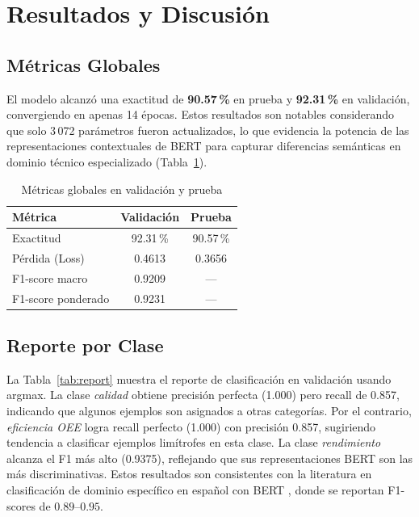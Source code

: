 \documentclass[conference]{IEEEtran}
\begin{document}
\section{Resultados y Discusión}

\subsection{Métricas Globales}

El modelo alcanzó una exactitud de \textbf{90.57\,\%} en prueba y
\textbf{92.31\,\%} en validación, convergiendo en apenas 14 épocas.
Estos resultados son notables considerando que solo 3\,072 parámetros
fueron actualizados, lo que evidencia la potencia de las representaciones
contextuales de BERT para capturar diferencias semánticas en dominio
técnico especializado (Tabla~\ref{tab:global}).

\begin{table}[h]
\centering
\caption{Métricas globales en validación y prueba}
\label{tab:global}
\begin{tabular}{lcc}
\toprule
\textbf{Métrica} & \textbf{Validación} & \textbf{Prueba} \\
\midrule
Exactitud        & 92.31\,\% & 90.57\,\% \\
Pérdida (Loss)   & 0.4613    & 0.3656    \\
F1-score macro   & 0.9209    & ---       \\
F1-score ponderado & 0.9231  & ---       \\
\bottomrule
\end{tabular}
\end{table}

\subsection{Reporte por Clase}

La Tabla~\ref{tab:report} muestra el reporte de clasificación en validación
usando argmax. La clase \textit{calidad} obtiene precisión perfecta (1.000)
pero recall de 0.857, indicando que algunos ejemplos son asignados a otras
categorías. Por el contrario, \textit{eficiencia OEE} logra recall perfecto
(1.000) con precisión 0.857, sugiriendo tendencia a clasificar ejemplos limítrofes
en esta clase. La clase \textit{rendimiento} alcanza el F1 más alto (0.9375),
reflejando que sus representaciones BERT son las más discriminativas. Estos
resultados son consistentes con la literatura en clasificación de dominio
específico en español con BERT \cite{canete2020spanish}, donde se reportan
F1-scores de $0.89$--$0.95$.
\end{document}
